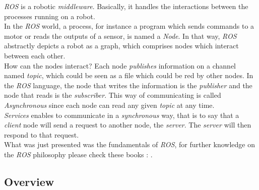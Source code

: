 			\textit{ROS} is a robotic \textit{middleware}. Basically, it
			handles the interactions between the processes
			running on a robot.
			\\\indent In the \textit{ROS} world, a process, for 
			instance a program which sends commands to a motor or reads the 
			outputs of a sensor, is named a \textit{Node}. In that way, 
			\textit{ROS} abstractly depicts a robot as a graph, which 
			comprises nodes which interact between each other.
			\\\indent How can the nodes interact? Each node \textit{publishes}
			information on a channel named \textit{topic}, which could 
			be seen as a file which could be red by other nodes.
			In the \textit{ROS} language, the node that 
			writes the information is the \textit{publisher}
			and the node that reads is the \textit{subscriber}.
			This way 
			of communicating is called \textit{Asynchronous} since 
			each node can read any given \textit{topic} at any time.
			\\\indent \textit{Services} enables to communicate in  a
			\textit{synchronous} way, that is to say that 
			a \textit{client} node will send a request to another node,
			the \textit{server}. The \textit{server} will then respond to 
			that request. 
			\\\indent What was just presented 
			was the fundamentals of \textit{ROS},
			for further knowledge on the \textit{ROS}
			philosophy please check these books : \cite{rosprojects,ros,buildingrobot, rosbyexample} .
			
		\subsection{Overview}
		
